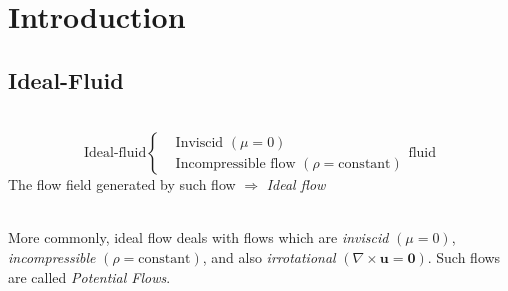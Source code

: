 \chapter{Introduction}
\section{Ideal-Fluid}
\begin{definition}\mbox{}\\
\[
\textrm{Ideal-fluid}
\left\{
\begin{aligned}
&\textrm{Inviscid }(\mu = 0)\\
&\textrm{Incompressible flow }(\rho=\textrm{constant})
\end{aligned}
\textrm{fluid}
\right.
\]
The flow field generated by such flow $\Longrightarrow$ \emph{Ideal flow}
\end{definition}
\begin{note}\mbox{}\\
More commonly, ideal flow deals with flows which are \emph{inviscid} $(\mu=0)$, \emph{incompressible} $(\rho=\textrm{constant})$, and also \emph{irrotational} $(\nabla\times\mathbf{u}=\mathbf{0})$. Such flows are called \emph{Potential Flows}.
\end{note}
